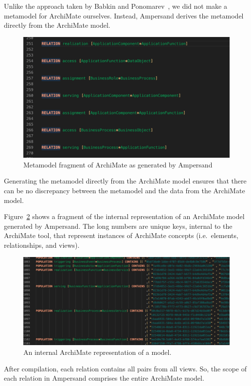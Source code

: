 \documentclass[sn-vancouver]{sn-jnl}%
\begin{document}
Unlike the approach taken by Babkin and Ponomarev~\cite{babkin2017analysis}, we did not make a metamodel for ArchiMate ourselves.
Instead, Ampersand derives the metamodel directly from the ArchiMate model.
\begin{figure}[b]
 \centering
\includegraphics[clip=true, scale=0.5]{MetamodelArchiMate generated by ArchiChecker}
\caption{Metamodel fragment of ArchiMate as generated by Ampersand}
\label{meta}   %
\end{figure}
Generating the metamodel directly from the ArchiMate model ensures that there can be no discrepancy between the metamodel and the data from the ArchiMate model.

Figure~\ref{populated} shows a fragment of the internal representation of an ArchiMate model generated by Ampersand.
The long numbers are unique keys, internal to the ArchiMate tool, that represent instances of ArchiMate concepts (i.e.\ elements, relationships, and views).
\begin{figure}[b]
 \centering
\includegraphics[clip=true, scale=0.4]{Populated model}
\caption{An internal ArchiMate representation of a model.}
\label{populated}   %
\end{figure}
After compilation, each relation contains all pairs from all views.
So, the scope of each relation in Ampersand comprises the entire ArchiMate model.
\end{document}
